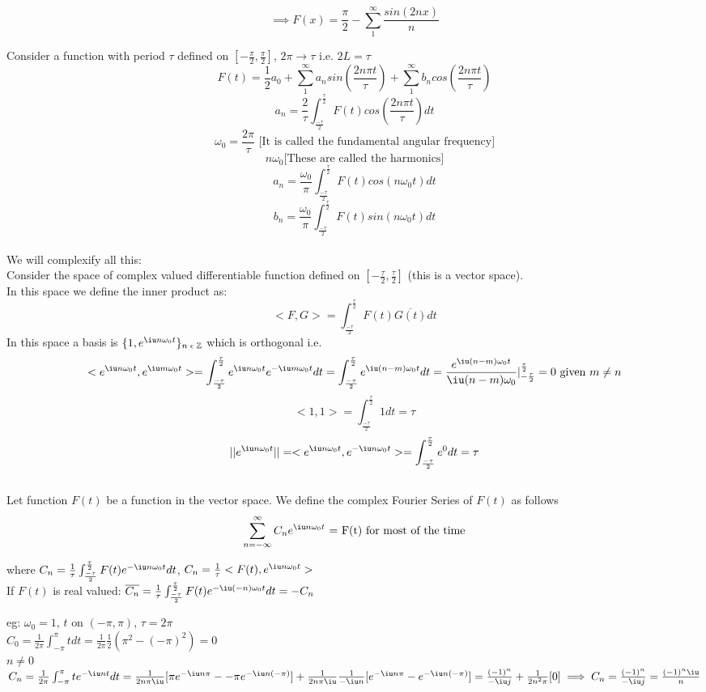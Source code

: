 \documentclass[11pt]{article}
\theoremstyle{definition}
\newcommand{\Z}{\mathbb{Z}}
\begin{document}
$$\implies F(x) = \frac{\pi}{2} - \sum^\infty_1 \frac{sin(2nx)}{n}$$

\newpage
Consider a function with period $\tau$ defined on $[-\frac{\pi}{2}, \frac{\pi}{2}]$, $2\pi \rightarrow \tau$ i.e. $2L = \tau$
$$F(t) = \frac{1}{2}a_0 + \sum^\infty_1 a_nsin(\frac{2n\pi t}{\tau}) + \sum^\infty_1 b_ncos(\frac{2n\pi t}{\tau})$$
$$a_n = \frac{2}{\tau}\int^{\frac{\tau}{2}}_{\frac{-\tau}{2}}F(t) cos(\frac{2n\pi t}{\tau})dt$$
$$\omega_0 = \frac{2\pi}{\tau} \text{ [It is called the fundamental angular frequency]}$$
$$n\omega_0 \text{[These are called the harmonics]}$$
$$a_n = \frac{\omega_0}{\pi} \int^{\frac{\tau}{2}}_{\frac{-\tau}{2}}F(t) cos(n\omega_0t)dt$$
$$b_n = \frac{\omega_0}{\pi} \int^{\frac{\tau}{2}}_{\frac{-\tau}{2}}F(t) sin(n\omega_0t)dt$$
\\
We will complexify all this:\\
Consider the space of complex valued differentiable function defined on $[-\frac{\tau}{2}, \frac{\tau}{2}]$ (this is a vector space).\\
In this space we define the inner product as:
$$<F,G> = \int^{\frac{\tau}{2}}_{\frac{-\tau}{2}} F(t)\overline{G(t)}dt$$
In this space a basis is $\{1, e^{\iu n\omega_0 t}\}_{n\; \epsilon\; \Z}$ which is orthogonal i.e.
$$<e^{\iu n\omega_0 t}, e^{\iu m\omega_0 t}> = \int^{\frac{\tau}{2}}_{\frac{-\tau}{2}} e^{\iu n\omega_0 t} e^{-\iu m\omega_0 t}dt = \int^{\frac{\tau}{2}}_{\frac{-\tau}{2}} e^{\iu (n-m)\omega_0 t}dt = \frac{e^{\iu(n-m)\omega_0t}}{\iu (n-m)\omega_0}|^\frac{\tau}{2}_{-\frac{\tau}{2}} = 0 \text{ given }m \neq n$$
$$<1,1> = \int^{\frac{\tau}{2}}_{\frac{-\tau}{2}} 1dt = \tau$$
$$||e^{\iu n\omega_0 t}|| =  <e^{\iu n\omega_0 t}, e^{-\iu n\omega_0 t}> = \int^{\frac{\tau}{2}}_{\frac{-\tau}{2}} e^0dt = \tau$$\\
Let function $F(t)$ be a function in the vector space. We define the complex Fourier Series of $F(t)$ as follows
$$\sum^\infty_{n=-\infty}C_ne^{
\iu n\omega_0t} \text{   = F(t) for most of the time}$$

where $C_n = \frac{1}{\tau} \int^{\frac{\tau}{2}}_{\frac{-\tau}{2}} F(t)e^{-\iu n \omega_0t} dt$, $C_n = \frac{1}{\tau} <F(t), e^{\iu n \omega_0 t}>$\\
If $F(t)$ is real valued: $\overline{C_n} = \frac{1}{\tau} \int^{\frac{\tau}{2}}_{\frac{-\tau}{2}} F(t)e^{-\iu (-n) \omega_0t} dt = -C_n$

eg: $\omega_0 = 1$, $t \text{ on } (-\pi, \pi)$, $\tau = 2\pi$\\
$C_0 = \frac{1}{2\pi} \int^\pi_{-\pi}tdt = \frac{1}{2\pi}\frac{1}{2}(\pi^2 - (-\pi)^2) = 0$\\
$n \neq 0$\\
$C_n = \frac{1}{2\pi} \int^\pi_{-\pi}t e^{-\iu n t}dt = \frac{1}{2n\pi \iu}[\pi e^{-\iu n \pi } - -\pi e^{-\iu n (-\pi) }] + \frac{1}{2n\pi \iu}\frac{1}{-\iu n}[e^{-\iu n \pi } - e^{-\iu n (-\pi) }] = \frac{(-1)^n}{- \iu j} + \frac{1}{2n^2\pi}[0]\\ \implies C_n =  \frac{(-1)^n}{- \iu j} = \frac{(-1)^n\iu}{n}$
\end{document}

